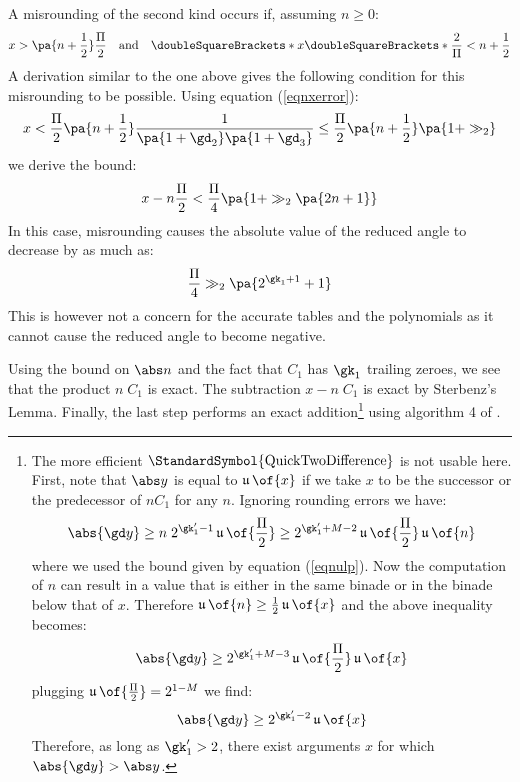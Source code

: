 \documentclass[10pt, a4paper, twoside]{basestyle}
\DeclareMathOperator{\ULP}{\mathfrak u}
\DeclareMathOperator{\quicktwodifference}{\StandardSymbol{QuickTwoDifference}}
\newcommand{\round}[1]{\doubleSquareBrackets*{#1}}
\begin{document}
A misrounding of the second kind occurs if, assuming $n \geq 0$:
\[
x > \pa{n + \frac{1}{2}}\frac{\Pi}{2} \quad \text{and} \quad \round{x \round{\frac{2}{\Pi}}} < n + \frac{1}{2}
\]
A derivation similar to the one above gives the following condition for this misrounding to be possible.  Using equation (\ref{eqnxerror}):
\[
x < \frac{\Pi}{2} \pa{n + \frac{1}{2}} \frac{1}{\pa{1 + \gd_2} \pa{1 + \gd_3}} \leq \frac{\Pi}{2} \pa{n + \frac{1}{2}} \pa{1 + \gg_2}
\]
we derive the bound:
\[
x - n \frac{\Pi}{2} < \frac{\Pi}{4} \pa{1 + \gg_2 \pa{2 n + 1}}
\]
In this case, misrounding causes the absolute value of the reduced angle to decrease by as much as:
\[
\frac{\Pi}{4} \gg_2 \pa{2^{\gk_1 + 1} + 1}
\]
This is however not a concern for the accurate tables and the polynomials as it cannot cause the reduced angle to become negative.

Using the bound on $\abs n$ and the fact that $C_1$ has $\gk_1$ trailing zeroes, we see that the product $n \; C_1$ is exact.  The subtraction $x - n \; C_1$ is exact by Sterbenz's Lemma.  Finally, the last step performs an exact addition\footnote{The more efficient $\quicktwodifference$ is not usable here.  First, note that $\abs y$ is equal to $\ULP\of{x}$ if we take $x$ to be the successor or the predecessor of $n C_1$ for any $n$. Ignoring rounding errors we have:
\[ 
\abs{\gd y} \geq n \; 2^{\gk'_1 - 1} \ULP\of{\frac{\Pi}{2}} \geq 2^{\gk'_1 + M - 2} \ULP\of{\frac{\Pi}{2}} \ULP\of{n}
\]
where we used the bound given by equation (\ref{eqnulp}).  Now the computation of $n$ can result in a value that is either in the same binade or in the binade below that of $x$.  Therefore $\ULP\of{n} \geq \frac{1}{2} \ULP\of{x}$ and the above inequality becomes:
\[
\abs{\gd y} \geq 2^{\gk'_1 + M - 3} \ULP\of{\frac{\Pi}{2}} \ULP\of{x}
\]
plugging $\ULP\of{\frac{\Pi}{2}} = 2^{1 - M}$ we find:
\[
\abs{\gd y} \geq 2^{\gk'_1 - 2} \ULP\of{x}
\]
Therefore, as long as $\gk'_1 > 2$, there exist arguments $x$ for which $\abs{\gd y} > \abs y$.
} using algorithm 4 of \cite{HidaLiBailey2007}.
\end{document}
